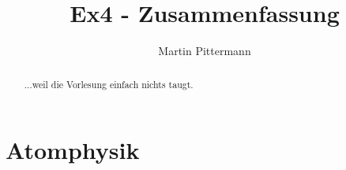 \documentclass[notitlepage]{report}
\title{Ex4 - Zusammenfassung}
\author{Martin Pittermann}
\begin{document}
\maketitle
\begin{abstract}
	...weil die Vorlesung einfach nichts taugt.\\
\end{abstract}

\chapter{Atomphysik}






\end{document}
